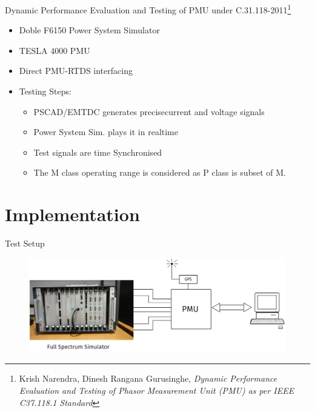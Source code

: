 \documentclass{beamer}
\begin{document}
\begin{frame}{\small{Dynamic Performance Evaluation and Testing of PMU under C.31.118-2011}\footnote{\tiny Krish Narendra, Dinesh Rangana Gurusinghe, \textit{Dynamic Performance Evaluation and Testing of Phasor Measurement Unit (PMU) as per IEEE C37.118.1 Standard}}}
\begin{itemize}
\item Doble F6150 Power System Simulator
\item TESLA 4000 PMU
\item Direct PMU-RTDS interfacing
\item Testing Steps:
\begin{itemize}
	\item PSCAD/EMTDC generates precisecurrent and voltage signals
	\item Power System Sim. plays it in realtime
	\item Test signals are time Synchronised
	\item The M class operating range is considered as P class is subset of M. 
\end{itemize}
\end{itemize}
\end{frame}

\section{Implementation}
\begin{frame}{Test Setup}
\begin{figure}
\includegraphics[width=\textwidth]{Test_setup.png}
\end{figure}
\end{frame}
   
\end{document}
